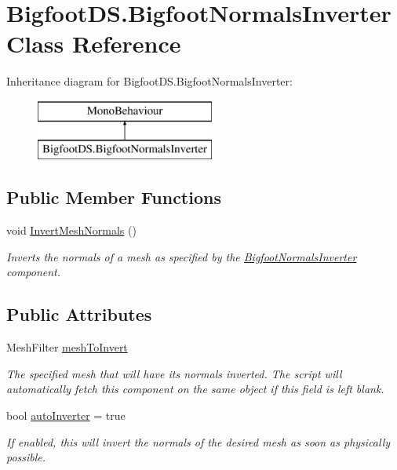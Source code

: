 \hypertarget{class_bigfoot_d_s_1_1_bigfoot_normals_inverter}{}\section{Bigfoot\+D\+S.\+Bigfoot\+Normals\+Inverter Class Reference}
\label{class_bigfoot_d_s_1_1_bigfoot_normals_inverter}
Inheritance diagram for Bigfoot\+D\+S.\+Bigfoot\+Normals\+Inverter\+:\begin{figure}[H]
\begin{center}
\leavevmode
\includegraphics[height=2.000000cm]{class_bigfoot_d_s_1_1_bigfoot_normals_inverter}
\end{center}
\end{figure}
\subsection*{Public Member Functions}
\begin{DoxyCompactItemize}
\item 
void \mbox{\hyperlink{class_bigfoot_d_s_1_1_bigfoot_normals_inverter_aa1e69f42fcba0e36398db1e8fd7d217f}{Invert\+Mesh\+Normals}} ()
\begin{DoxyCompactList}\small\item\em Inverts the normals of a mesh as specified by the \mbox{\hyperlink{class_bigfoot_d_s_1_1_bigfoot_normals_inverter}{Bigfoot\+Normals\+Inverter}} component. \end{DoxyCompactList}\end{DoxyCompactItemize}
\subsection*{Public Attributes}
\begin{DoxyCompactItemize}
\item 
Mesh\+Filter \mbox{\hyperlink{class_bigfoot_d_s_1_1_bigfoot_normals_inverter_ae9f17ad0ec0cc214b044d8ee8f5c6ba7}{mesh\+To\+Invert}}
\begin{DoxyCompactList}\small\item\em The specified mesh that will have its normals inverted. The script will automatically fetch this component on the same object if this field is left blank. \end{DoxyCompactList}\item 
bool \mbox{\hyperlink{class_bigfoot_d_s_1_1_bigfoot_normals_inverter_aafe7464bb4afaa60822e2463d541bf77}{auto\+Inverter}} = true
\begin{DoxyCompactList}\small\item\em If enabled, this will invert the normals of the desired mesh as soon as physically possible. \end{DoxyCompactList}\end{DoxyCompactItemize}


